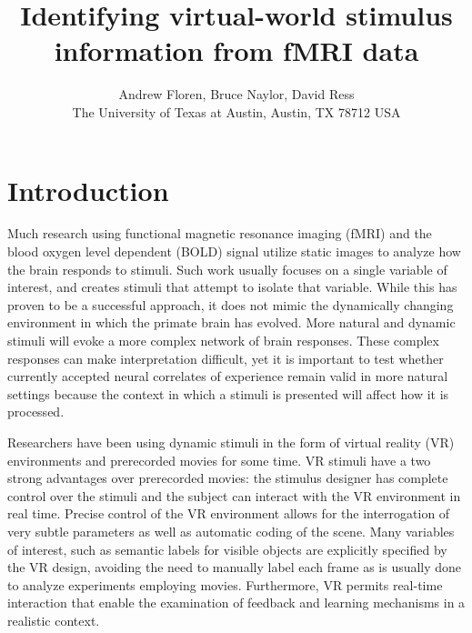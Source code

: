 \documentclass{article}
\begin{document}
\title{Identifying virtual-world stimulus information from fMRI data}

\author{Andrew Floren, Bruce Naylor, David Ress \\ The University of Texas at Austin, Austin, TX 78712 USA}

\date{}

\maketitle

\section{Introduction}
Much research using functional magnetic resonance imaging (fMRI) and the blood oxygen level dependent (BOLD) signal utilize static images to analyze how the brain responds to stimuli.
Such work usually focuses on a single variable of interest, and creates stimuli that attempt to isolate that variable.
While this has proven to be a successful approach, it does not mimic the dynamically changing environment in which the primate brain has evolved.
More natural and dynamic stimuli will evoke a more complex network of brain responses.
These complex responses can make interpretation difficult, yet it is important to test whether currently accepted neural correlates of experience remain valid in more natural settings because the context in which a stimuli is presented will affect how it is processed.

Researchers have been using dynamic stimuli in the form of virtual reality (VR) environments \citep{Maguire1998,Calhoun2002,King2006,Mathiak2006,Spiers2007a,Hassabis2009} and prerecorded movies \citep{Hasson2004,Chadwick2010,Nishimoto2011} for some time.
VR stimuli have a two strong advantages over prerecorded movies: the stimulus designer has complete control over the stimuli and the subject can interact with the VR environment in real time.
Precise control of the VR environment allows for the interrogation of very subtle parameters as well as automatic coding of the scene.
Many variables of interest, such as semantic labels for visible objects are explicitly specified by the VR design, avoiding the need to manually label each frame as is usually done to analyze experiments employing movies.
Furthermore, VR permits real-time interaction that enable the examination of feedback and learning mechanisms in a realistic context.
\end{document}
